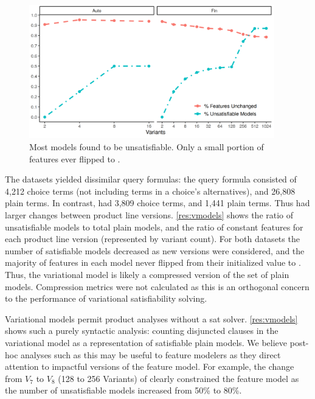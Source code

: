 ~\label{section:case-studies:results-and-discussion}

\begin{figure}
  \includegraphics[width=0.95\textwidth]{Plots/VModel}
  \caption{Most models found to be unsatisfiable. Only a small portion of
    features ever flipped to \tru.}%
  \label{res:vmodels}
\end{figure}

The datasets yielded dissimilar query formulas: the \auto{} query formula
consisted of 4,212 choice terms (not including terms in a choice's
alternatives), and 26,808 plain terms. In contrast, \fin{} had 3,809 choice
terms, and 1,441 plain terms. Thus \fin{} had larger changes between product
line versions. \autoref{res:vmodels} shows the ratio of unsatisfiable models to
total plain models, and the ratio of constant features for each product line
version (represented by variant count). For both datasets the number of
satisfiable models decreased as new versions were considered, and the majority
of features in each model never flipped from their initialized value \fls{} to
\tru{}. Thus, the variational model is likely a compressed version of the set
of plain models. Compression metrics were not calculated as this is an
orthogonal concern to the performance of variational satisfiability solving.

Variational models permit product analyses without a \ac{sat} solver.
\autoref{res:vmodels} shows such a purely syntactic analysis: counting
disjuncted clauses in the variational model as a representation of satisfiable
plain models. We believe post-hoc analyses such as this may be useful to feature
modelers as they direct attention to impactful versions of the feature model.
For example, the change from $V_{7}$ to $V_{8}$ (128 to 256 Variants) of \fin{}
clearly constrained the feature model as the number of unsatisfiable models
increased from 50\% to 80\%.

